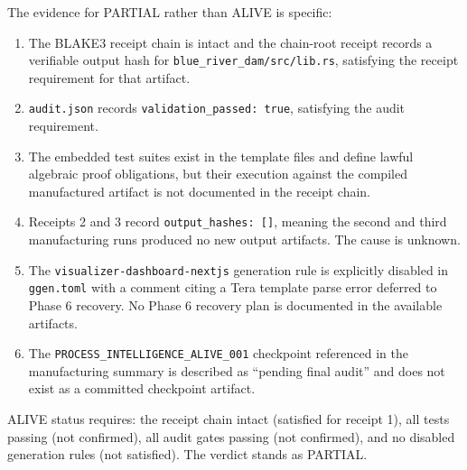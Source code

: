 The evidence for PARTIAL rather than ALIVE is specific:

\begin{enumerate}
  \item The BLAKE3 receipt chain is intact and the chain-root receipt records a verifiable output
    hash for \texttt{blue\_river\_dam/src/lib.rs}, satisfying the receipt requirement for that
    artifact.
  \item \texttt{audit.json} records \texttt{validation\_passed: true}, satisfying the audit
    requirement.
  \item The embedded test suites exist in the template files and define lawful algebraic proof
    obligations, but their execution against the compiled manufactured artifact is not documented
    in the receipt chain.
  \item Receipts 2 and 3 record \texttt{output\_hashes: []}, meaning the second and third
    manufacturing runs produced no new output artifacts. The cause is unknown.
  \item The \texttt{visualizer-dashboard-nextjs} generation rule is explicitly disabled in
    \texttt{ggen.toml} with a comment citing a Tera template parse error deferred to Phase 6
    recovery. No Phase 6 recovery plan is documented in the available artifacts.
  \item The \texttt{PROCESS\_INTELLIGENCE\_ALIVE\_001} checkpoint referenced in the manufacturing
    summary is described as ``pending final audit'' and does not exist as a committed checkpoint
    artifact.
\end{enumerate}

ALIVE status requires: the receipt chain intact (satisfied for receipt 1), all tests passing
(not confirmed), all audit gates passing (not confirmed), and no disabled generation rules
(not satisfied). The verdict stands as PARTIAL.
